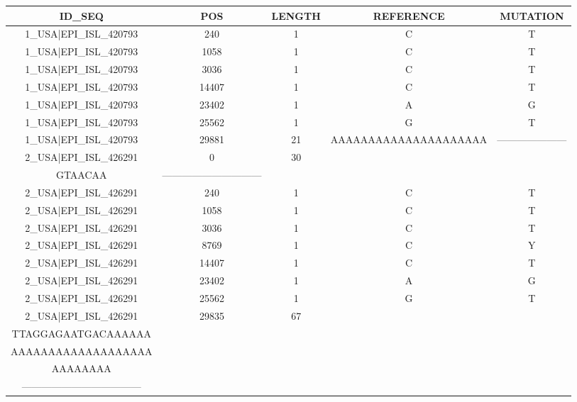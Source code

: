 \documentclass[a4paper,10pt]{article}
\begin{document}
\setlength\LTleft{-2.3 cm}
\begin{longtable}{@{}ccccc@{}}
\toprule
\textbf{ID\_SEQ} & \textbf{POS} & \textbf{LENGTH} & \textbf{REFERENCE} & \textbf{MUTATION} \\* \midrule
\endfirsthead
%
\cline{1-5}
\endhead
%
1\_USA|EPI\_ISL\_420793 & 240 & 1 & C & T \\* \midrule
1\_USA|EPI\_ISL\_420793 & 1058 & 1 & C & T \\* \midrule
1\_USA|EPI\_ISL\_420793 & 3036 & 1 & C & T \\* \midrule
1\_USA|EPI\_ISL\_420793 & 14407 & 1 & C & T \\* \midrule
1\_USA|EPI\_ISL\_420793 & 23402 & 1 & A & G \\* \midrule
1\_USA|EPI\_ISL\_420793 & 25562 & 1 & G & T \\* \midrule
1\_USA|EPI\_ISL\_420793 & 29881 & 21 & AAAAAAAAAAAAAAAAAAAAA & --------------------- \\* \midrule
2\_USA|EPI\_ISL\_426291 & 0 & 30 & \begin{tabular}[c]{@{}c@{}}ATTAAAGGTTTATACCTTCCCAG\\ GTAACAA\end{tabular} & ------------------------------ \\* \midrule
2\_USA|EPI\_ISL\_426291 & 240 & 1 & C & T \\* \midrule
2\_USA|EPI\_ISL\_426291 & 1058 & 1 & C & T \\* \midrule
2\_USA|EPI\_ISL\_426291 & 3036 & 1 & C & T \\* \midrule
2\_USA|EPI\_ISL\_426291 & 8769 & 1 & C & Y \\* \midrule
2\_USA|EPI\_ISL\_426291 & 14407 & 1 & C & T \\* \midrule
2\_USA|EPI\_ISL\_426291 & 23402 & 1 & A & G \\* \midrule
2\_USA|EPI\_ISL\_426291 & 25562 & 1 & G & T \\* \midrule
2\_USA|EPI\_ISL\_426291 & 29835 & 67 & \begin{tabular}[c]{@{}c@{}}CCATGTGATTTTAATAGCTTC\\ TTAGGAGAATGACAAAAAA\\ AAAAAAAAAAAAAAAAAAA\\ AAAAAAAA\end{tabular} & \begin{tabular}[c]{@{}c@{}}-------------------------------\\ ------------------------------------\end{tabular} \\* \midrule

\end{longtable}
\end{document}
